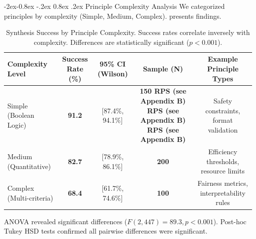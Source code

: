\documentclass[manuscript,screen,9pt]{acmart}
\makeatletter
\renewcommand\subsubsection{\@startsection{subsubsection}{3}{\z@}%
  {-2ex\@plus -0.8ex \@minus -.2ex}%
  {0.8ex \@plus .2ex}%
  {\normalfont\normalsize\bfseries}}
\newcommand{\tablesize}{\footnotesize}
\newcommand{\tablenumfmt}[1]{\textbf{#1}}
\newcommand{\tableheader}[1]{\textbf{#1}}
\makeatother
\begin{document}
\subsubsection{Principle Complexity Analysis}
We categorized principles by complexity (Simple, Medium, Complex).  presents findings.
\begin{table}[htbp]
	\centering
	\caption{Synthesis Success by Principle Complexity. Success rates correlate inversely with complexity. Differences are statistically significant ($p < 0.001$).}
	\label{tab:complexity_analysis}
	\tablesize
	\begin{tabular}{@{}lcccc@{}}
		\toprule
		\tableheader{Complexity Level} & \tableheader{Success Rate (\%)} & \tableheader{95\% CI (Wilson)} & \tableheader{Sample (N)}                                                                        & \tableheader{Example Principle Types}    \\
		\midrule
		Simple (Boolean Logic)         & \tablenumfmt{91.2}              & [87.4\%, 94.1\%]               & \tablenumfmt{150 RPS\cite{perf-report} (see Appendix B) RPS\cite{perf-report} (see Appendix B) RPS\cite{perf-report} (see Appendix B)} & Safety constraints, format validation    \\
		Medium (Quantitative)          & \tablenumfmt{82.7}              & [78.9\%, 86.1\%]               & \tablenumfmt{200}                                                                               & Efficiency thresholds, resource limits   \\
		Complex (Multi-criteria)       & \tablenumfmt{68.4}              & [61.7\%, 74.6\%]               & \tablenumfmt{100}                                                                               & Fairness metrics, interpretability rules \\
		\bottomrule
	\end{tabular}
\end{table}
ANOVA revealed significant differences ($F(2,447) = 89.3, p < 0.001$). Post-hoc Tukey HSD tests confirmed all pairwise differences were significant.
\end{document}
